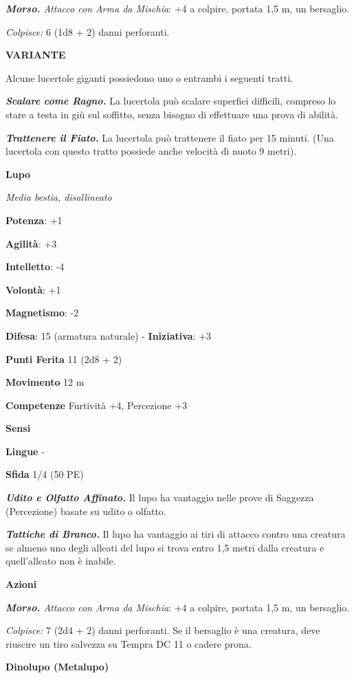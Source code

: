 \begin{multicols}{2}
\emph{\textbf{Morso.} Attacco con Arma da Mischia}: +4 a colpire,
portata 1,5 m, un bersaglio.

\emph{Colpisce:} 6 (1d8 + 2) danni perforanti.

\textbf{VARIANTE}

Alcune lucertole giganti possiedono uno o entrambi i seguenti tratti.

\emph{\textbf{Scalare come Ragno.}} La lucertola può scalare superfici
difficili, compreso lo stare a testa in giù sul soffitto, senza bisogno
di effettuare una prova di abilità.

\emph{\textbf{Trattenere il Fiato.}} La lucertola può trattenere il
fiato per 15 minuti. (Una lucertola con questo tratto possiede anche
velocità di nuoto 9 metri).

\textbf{Lupo}

\emph{Media bestia, disallineato}

\textbf{Potenza}: +1

\textbf{Agilità}: +3

\textbf{Intelletto}: -4

\textbf{Volontà}: +1

\textbf{Magnetismo}: -2

\textbf{Difesa}: 15 (armatura naturale) - \textbf{Iniziativa}: +3

\textbf{Punti Ferita} 11 (2d8 + 2)

\textbf{Movimento} 12 m

\textbf{Competenze} Furtività +4, Percezione +3

\textbf{Sensi} 

\textbf{Lingue} -

\textbf{Sfida} 1/4 (50 PE)

\emph{\textbf{Udito e Olfatto Affinato.}} Il lupo ha vantaggio nelle
prove di Saggezza (Percezione) basate su udito o olfatto.

\emph{\textbf{Tattiche di Branco.}} Il lupo ha vantaggio ai tiri di
attacco contro una creatura se almeno uno degli alleati del lupo si
trova entro 1,5 metri dalla creatura e quell'alleato non è inabile.

\textbf{Azioni}

\emph{\textbf{Morso.} Attacco con Arma da Mischia}: +4 a colpire,
portata 1,5 m, un bersaglio.

\emph{Colpisce:} 7 (2d4 + 2) danni perforanti. Se il bersaglio è una
creatura, deve riuscire un tiro salvezza su Tempra DC 11 o cadere prona.

\textbf{Dinolupo (Metalupo)}


\end{multicols}
